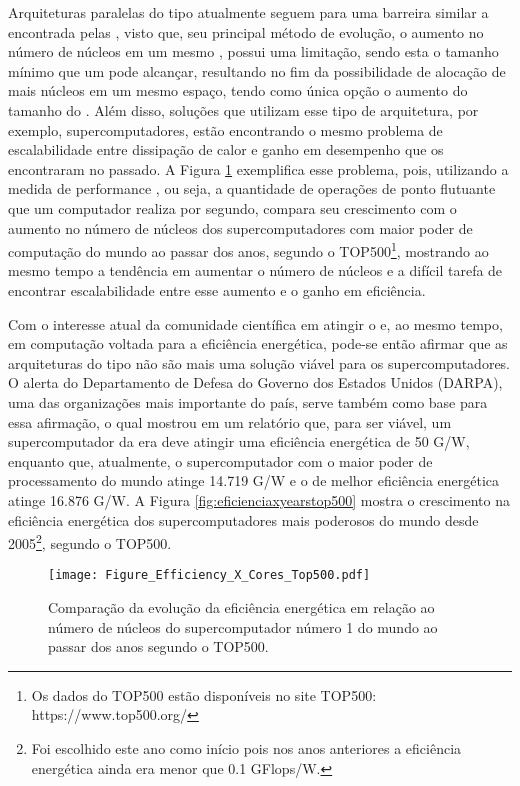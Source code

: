 Arquiteturas paralelas do tipo \multicore atualmente seguem para uma barreira similar a encontrada pelas \singlecore, visto que, seu principal método de evolução, o aumento no número de núcleos em um mesmo \chip, possui uma limitação, sendo esta o tamanho mínimo que um \transistor pode alcançar, resultando no fim da possibilidade de alocação de mais núcleos em um mesmo espaço, tendo como única opção o aumento do tamanho do \chip. Além disso, soluções que utilizam esse tipo de arquitetura, por exemplo, supercomputadores, estão encontrando o mesmo problema de escalabilidade entre dissipação de calor e ganho em desempenho que os \singlecore encontraram no passado. A Figura \ref{fig:eficienciaxcorestop500} exemplifica esse problema, pois, utilizando a medida de performance \textit{\Flops}, ou seja, a quantidade de operações de ponto flutuante que um computador realiza por segundo, compara seu crescimento com o aumento no número de núcleos dos supercomputadores com maior poder de computação do mundo ao passar dos anos, segundo o \ranking TOP500\footnote{Os dados do \ranking TOP500 estão disponíveis no site TOP500: https://www.top500.org/}, mostrando ao mesmo tempo a tendência em aumentar o número de núcleos e a difícil tarefa de encontrar escalabilidade entre esse aumento e o ganho em eficiência.

Com o interesse atual da comunidade científica em atingir o \exascale e, ao mesmo tempo, em computação voltada para a eficiência energética, pode-se então afirmar que as arquiteturas do tipo \multicore não são mais uma solução viável para os supercomputadores. O alerta do Departamento de Defesa do Governo dos Estados Unidos (DARPA), uma das organizações mais importante do país, serve também como base para essa afirmação, o qual mostrou em um relatório \cite{darpa:exascale} que, para ser viável, um supercomputador da era  \exascale deve atingir uma eficiência energética de 50 G\Flops/W, enquanto que, atualmente, o supercomputador com o maior poder de processamento do mundo atinge 14.719 G\Flops/W e o de melhor eficiência energética atinge 16.876 G\Flops/W. A Figura \ref{fig:eficienciaxyearstop500} mostra o crescimento na eficiência energética dos supercomputadores mais poderosos do mundo desde 2005\footnote{Foi escolhido este ano como início pois nos anos anteriores a eficiência energética ainda era menor que 0.1 GFlops/W.}, segundo o \ranking TOP500.

\begin{figure}[tb]
  \centering
  \caption{Comparação da evolução da eficiência energética em relação ao número de núcleos do supercomputador número 1 do mundo ao passar dos anos segundo o \ranking TOP500.}
  \label{fig:eficienciaxcorestop500}
  \texttt{[image: Figure\_Efficiency\_X\_Cores\_Top500.pdf]}
\end{figure}

